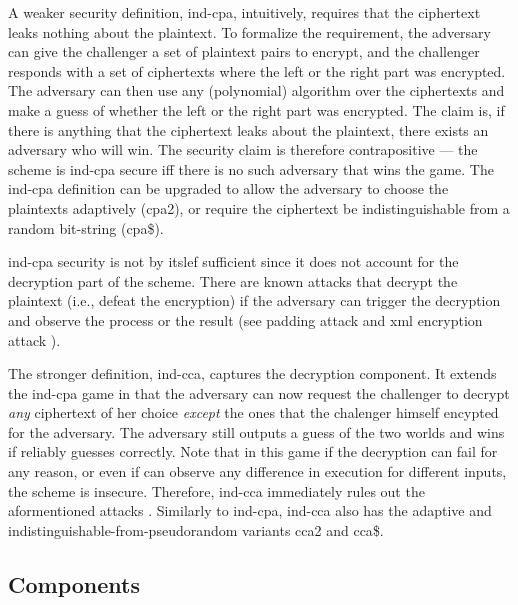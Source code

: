 			A weaker security definition, \acrfull{ind-cpa}, intuitively, requires that the ciphertext leaks nothing about the plaintext.
			To formalize the requirement, the adversary can give the challenger a set of plaintext pairs to encrypt, and the challenger responds with a set of ciphertexts where the left or the right part was encrypted.
			The adversary can then use any (polynomial) algorithm over the ciphertexts and make a guess of whether the left or the right part was encrypted.
			The claim is, if there is anything that the ciphertext leaks about the plaintext, there exists an adversary who will win.
			The security claim is therefore contrapositive --- the scheme is \acrshort{ind-cpa} secure iff there is no such adversary that wins the game.
			The \acrshort{ind-cpa} definition can be upgraded to allow the adversary to choose the plaintexts adaptively (\acrshort{cpa}2), or require the ciphertext be indistinguishable from a random bit-string (\acrshort{cpa}\$).

			\acrshort{ind-cpa} security is not by itslef sufficient since it does not account for the decryption part of the scheme.
			There are known attacks that decrypt the plaintext (i.e., defeat the encryption) if the adversary can trigger the decryption and observe the process or the result (see padding attack \cite{padding-attack} and \acrshort{xml} encryption attack \cite{xml-break-encryption}).

			The stronger definition, \acrfull{ind-cca}, captures the decryption component.
			It extends the \acrshort{ind-cpa} game in that the adversary can now request the challenger to decrypt \emph{any} ciphertext of her choice \emph{except} the ones that the chalenger himself encypted for the adversary.
			The adversary still outputs a guess of the two worlds and wins if reliably guesses correctly.
			Note that in this game if the decryption can fail for any reason, or even if \adversary{} can observe any difference in execution for different inputs, the scheme is insecure.
			Therefore, \acrshort{ind-cca} immediately rules out the aformentioned attacks \cite{padding-attack,xml-break-encryption}.
			Similarly to \acrshort{ind-cpa}, \acrshort{ind-cca} also has the adaptive and indistinguishable\hyp{}from\hyp{}pseudorandom variants \acrshort{cca}2 and \acrshort{cca}\$.

		\subsection{Components}

